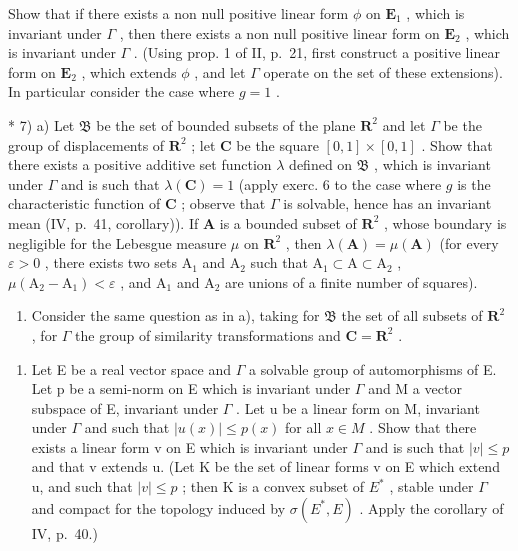 Show that if there exists a non null positive linear form \(\phi\) on \(\mathbf{E}_1\) , which is invariant under \(\Gamma\) , then there exists a non null positive linear form on \(\mathbf{E}_2\) , which is invariant under \(\Gamma\) . (Using prop. 1 of II, p.~21, first construct a positive linear form on \(\mathbf{E}_2\) , which extends \(\phi\) , and let \(\Gamma\) operate on the set of these extensions). In particular consider the case where \(g = 1\) .

* 7) a) Let \(\mathfrak{B}\) be the set of bounded subsets of the plane \(\mathbf{R}^2\) and let \(\Gamma\) be the group of displacements of \(\mathbf{R}^2\) ; let \(\mathbf{C}\) be the square \([0,1]\times [0,1]\) . Show that there exists a positive additive set function \(\lambda\) defined on \(\mathfrak{B}\) , which is invariant under \(\Gamma\) and is such that \(\lambda (\mathbf{C}) = 1\) (apply exerc. 6 to the case where \(g\) is the characteristic function of \(\mathbf{C}\) ; observe that \(\Gamma\) is solvable, hence has an invariant mean (IV, p.~41, corollary)). If \(\mathbf{A}\) is a bounded subset of \(\mathbf{R}^2\) , whose boundary is negligible for the Lebesgue measure \(\mu\) on \(\mathbf{R}^2\) , then \(\lambda (\mathbf{A}) = \mu (\mathbf{A})\) (for every \(\varepsilon >0\) , there exists two sets \(\mathrm{A}_1\) and \(\mathrm{A}_2\) such that \(\mathrm{A}_1\subset \mathrm{A}\subset \mathrm{A}_2\) , \(\mu (\mathrm{A}_2 - \mathrm{A}_1) < \varepsilon\) , and \(\mathrm{A}_1\) and \(\mathrm{A}_2\) are unions of a finite number of squares).

\begin{enumerate}
\def\labelenumi{\alph{enumi})}
\setcounter{enumi}{1}
\tightlist
\item
  Consider the same question as in a), taking for \(\mathfrak{B}\) the set of all subsets of \(\mathbf{R}^2\) , for \(\Gamma\) the group of similarity transformations and \(\mathbf{C} = \mathbf{R}^2\) .
\end{enumerate}

\begin{enumerate}
\def\labelenumi{\arabic{enumi})}
\setcounter{enumi}{7}
\tightlist
\item
  Let E be a real vector space and \(\Gamma\) a solvable group of automorphisms of E. Let p be a semi-norm on E which is invariant under \(\Gamma\) and M a vector subspace of E, invariant under \(\Gamma\) . Let u be a linear form on M, invariant under \(\Gamma\) and such that \(|u(x)| \leqslant p(x)\) for all \(x \in M\) . Show that there exists a linear form v on E which is invariant under \(\Gamma\) and is such that \(|v| \leqslant p\) and that v extends u. (Let K be the set of linear forms v on E which extend u, and such that \(|v| \leqslant p\) ; then K is a convex subset of \(E^{*}\) , stable under \(\Gamma\) and compact for the topology induced by \(\sigma(E^{*}, E)\) . Apply the corollary of IV, p.~40.)
\end{enumerate}

